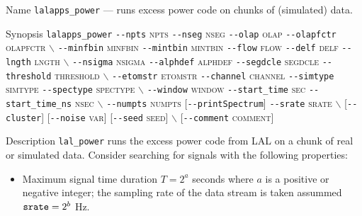 \begin{entry}

\item[Name]
\verb$lalapps_power$ --- runs excess power code on chunks of (simulated) data.

\item[Synopsis]
\verb$lalapps_power$ \verb$--npts$ \textsc{npts} \verb$--nseg$ \textsc{nseg}
\verb$--olap$ \textsc{olap} \verb$--olapfctr$ \textsc{olapfctr}
$\backslash$ \newline \hspace*{0.25in}
\verb$--minfbin$ \textsc{minfbin} \verb$--mintbin$ \textsc{mintbin} 
\verb$--flow$ \textsc{flow} \verb$--delf$ \textsc{delf} 
\verb$--lngth$ \textsc{lngth} 
$\backslash$ \newline \hspace*{0.25in}
\verb$--nsigma$ \textsc{nsigma}
\verb$--alphdef$ \textsc{alphdef}  \verb$--segdcle$ \textsc{segdcle} 
\verb$--threshold$ \textsc{threshold} 
$\backslash$ \newline \hspace*{0.25in}
\verb$--etomstr$ \textsc{etomstr}
\verb$--channel$ \textsc{channel} \verb$--simtype$ \textsc{simtype} 
\verb$--spectype$ \textsc{spectype} 
$\backslash$ \newline \hspace*{0.25in}
\verb$--window$ \textsc{window} \verb$--start_time$ \textsc{sec} 
\verb$--start_time_ns$ \textsc{nsec} 
$\backslash$ \newline \hspace*{0.25in}
\verb$--numpts$ \textsc{numpts} [\verb$--printSpectrum$] 
\verb$--srate$ \textsc{srate} 
$\backslash$ \newline \hspace*{0.25in}
[\verb$--cluster$]
[\verb$--noise$ \textsc{var}] [\verb$--seed$ \textsc{seed}] 
$\backslash$ \newline \hspace*{0.25in}
[\verb$--comment$ \textsc{comment}]

\item[Description] 
\verb$lal_power$ runs the excess power code from LAL on a chunk of
real or simulated data.    Consider searching  for signals with the
following properties:
\begin{itemize}
\item Maximum signal time duration $T=2^a$ seconds where $a$ is a
positive or negative integer;  the sampling rate of the data stream is
taken assummed $\mbox{\texttt{srate}} = 2^b$ Hz.


\end{itemize}
\end{entry}
